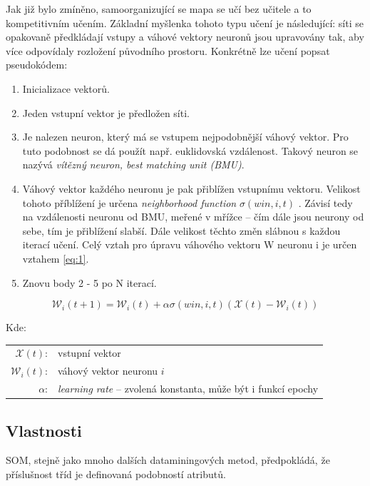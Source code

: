 \documentclass[thesis=M,czech]{FITthesis}[2012/06/26]
\begin{document}
Jak již bylo zmíněno, samoorganizující se mapa se učí bez učitele a to kompetitivním učením. Základní myšlenka tohoto typu učení je následující: síti se opakovaně předkládají vstupy a váhové vektory neuronů jsou upravovány tak, aby více odpovídaly rozložení původního prostoru.
Konkrétně lze učení popsat pseudokódem:

\begin{enumerate}
\item Inicializace vektorů.
\item Jeden vstupní vektor je předložen síti.
\item Je nalezen neuron, který má se vstupem nejpodobnější váhový vektor. Pro tuto podobnost se dá použít např. euklidovská vzdálenost. Takový neuron se nazývá \textit{vítězný neuron, best matching unit (BMU)}.
\item Váhový vektor každého neuronu je pak přiblížen vstupnímu vektoru. Velikost tohoto příblížení je určena \textit{neighborhood function} $\sigma(win, i, t)$ .
Závisí tedy na vzdálenosti neuronu od BMU, meřené v mřížce -- čím dále jsou neurony od sebe, tím je přiblížení slabší. Dále velikost těchto změn slábnou s každou iterací učení. Celý vztah pro úpravu váhového vektoru W neuronu i je určen vztahem \ref{eq:1}.


\item Znovu body 2 - 5 po N iterací.
\end{enumerate}

\begin{equation} \label{eq:1}
    \mathcal{W}_i(t+1) = \mathcal{W}_i(t) + \alpha \sigma(win, i, t)(\mathcal{X}(t) - \mathcal{W}_i(t))    
\end{equation}

Kde:\\
\hspace*{3em}
\begin{tabular}{rl}
    $\mathcal{X}(t)$:& vstupní vektor \\
    $\mathcal{W}_i(t)$:& váhový vektor neuronu $i$ \\
    $\alpha$:& \textit{learning rate} -- zvolená konstanta, může být i funkcí epochy \\
\end{tabular}


\subsection{Vlastnosti}
SOM, stejně jako mnoho dalších dataminingových metod, předpokládá, že příslušnost tříd je definovaná podobností atributů.
\end{document}
